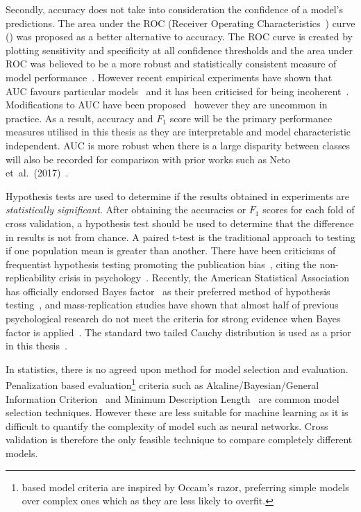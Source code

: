 \documentclass[12pt, twoside]{book}
\renewcommand\emph[1]{\textit{\color{USred}{#1}}}
\begin{document}
Secondly, accuracy does not take into consideration the confidence of a model's predictions. The area under the ROC (Receiver Operating Characteristics~\cite{rocauc}) curve (\emph{AUC}) was proposed as a better alternative to accuracy. The ROC curve is created by plotting sensitivity and specificity at all confidence thresholds and the area under ROC was believed to be a more robust and statistically consistent measure of model performance~\cite{aucgood}. However recent empirical experiments have shown that AUC favours particular models~\cite{aucmislead2} and it has been criticised for being incoherent~\cite{aucmislead, aucincoherent}. Modifications to AUC have been proposed~\cite{aucmislead2, aucincoherent} however they are uncommon in practice. As a result, accuracy and $F_1$ score will be the primary performance measures utilised in this thesis as they are interpretable and model characteristic independent. AUC is more robust when there is a large disparity between classes will also be recorded for comparison with prior works such as Neto et~al.~(2017)~\cite{mpowerneto2017analysis}.


Hypothesis tests are used to determine if the results obtained in experiments are \textit{statistically significant}. After obtaining the accuracies or $F_1$ scores for each fold of cross validation, a hypothesis test should be used to determine that the difference in results is not from chance. A paired t-test is the traditional approach to testing if one population mean is greater than another. There have been criticisms of frequentist hypothesis testing promoting the publication bias~\cite{publicationbias}, citing the non-replicability crisis in psychology~\cite{replicability}. Recently, the American Statistical Association has officially endorsed Bayes factor~\cite{bayesianttests} as their preferred method of hypothesis testing~\cite{bayesfactorASA}, and mass-replication studies have shown that almost half of previous psychological research do not meet the criteria for strong evidence when Bayes factor is applied~\cite{bayesfactorempirical}. The standard two tailed Cauchy distribution is used as a prior in this thesis~\cite{bayesianttests}.


In statistics, there is no agreed upon method for model selection and evaluation. Penalization based evaluation\footnote{\emph{Penalization} based model criteria are inspired by Occam's razor, preferring simple models over complex ones which as they are less likely to overfit.}  criteria such as Akaline/Bayesian/General Information Criterion~\cite{aicbic,generalinfocriteriongic} and Minimum Description Length~\cite{mindescriptionlength} are common model selection techniques. However these are less suitable for machine learning as it is difficult to quantify the complexity of model such as neural networks. Cross validation is therefore the only feasible technique to compare completely different models. 
 
\end{document}
